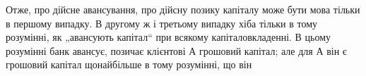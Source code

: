 Отже, про дійсне авансування, про дійсну позику капіталу
може бути мова тільки в першому випадку. В другому ж і третьому
випадку хіба тільки в тому розумінні, як „авансують капітал“
при всякому капіталовкладенні. В цьому розумінні банк
авансує, позичає клієнтові А грошовий капітал; але для А він
є грошовий капітал щонайбільше в тому розумінні, що він
\parbreak{}  %
